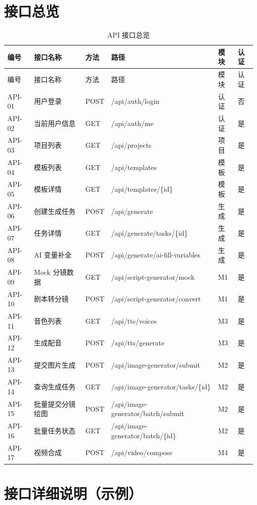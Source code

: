 \documentclass[12pt]{ctexrep}
\begin{document}
\section{接口总览}

\begin{longtable}{p{1.6cm}p{3.6cm}p{1.8cm}p{4.6cm}p{1.6cm}p{1.2cm}}
\caption{API 接口总览}\label{tab:api}\\
\toprule
编号 & 接口名称 & 方法 & 路径 & 模块 & 认证\\
\midrule
\endfirsthead
\toprule
编号 & 接口名称 & 方法 & 路径 & 模块 & 认证\\
\midrule
\endhead
API-01 & 用户登录 & POST & /api/auth/login & 认证 & 否\\
API-02 & 当前用户信息 & GET & /api/auth/me & 认证 & 是\\
API-03 & 项目列表 & GET & /api/projects & 项目 & 是\\
API-04 & 模板列表 & GET & /api/templates & 模板 & 是\\
API-05 & 模板详情 & GET & /api/templates/\{id\} & 模板 & 是\\
API-06 & 创建生成任务 & POST & /api/generate & 生成 & 是\\
API-07 & 任务详情 & GET & /api/generate/tasks/\{id\} & 生成 & 是\\
API-08 & AI 变量补全 & POST & /api/generate/ai-fill-variables & 生成 & 是\\
API-09 & Mock 分镜数据 & GET & /api/script-generator/mock & M1 & 是\\
API-10 & 剧本转分镜 & POST & /api/script-generator/convert & M1 & 是\\
API-11 & 音色列表 & GET & /api/tts/voices & M3 & 是\\
API-12 & 生成配音 & POST & /api/tts/generate & M3 & 是\\
API-13 & 提交图片生成 & POST & /api/image-generator/submit & M2 & 是\\
API-14 & 查询生成任务 & GET & /api/image-generator/tasks/\{id\} & M2 & 是\\
API-15 & 批量提交分镜绘图 & POST & /api/image-generator/batch/submit & M2 & 是\\
API-16 & 批量任务状态 & GET & /api/image-generator/batch/\{id\} & M2 & 是\\
API-17 & 视频合成 & POST & /api/video/compose & M4 & 是\\
\bottomrule
\end{longtable}

\section{接口详细说明（示例）}
\end{document}
